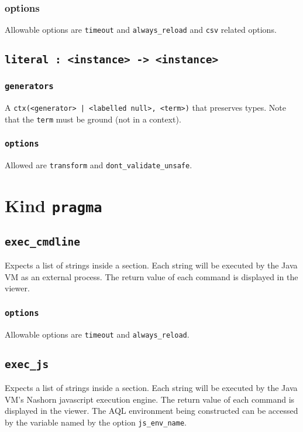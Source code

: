 \documentclass[10pt]{book}
\begin{document}
\subsection{options}
Allowable options are {\tt timeout} and {\tt always\_reload}  and {\tt csv} related options. 

\section{{\tt literal : <instance> -> <instance>}}

\subsection{{\tt generators}}
A {\tt ctx(<generator> | <labelled null>, <term>)} that preserves types.  Note that the {\tt term} must be ground (not in a context).  

\subsection{{\tt options}}
Allowed are {\tt transform} and {\tt dont\_validate\_unsafe}.

\chapter{Kind {\tt pragma}}
\section{{\tt exec\_cmdline}}
Expects a list of strings inside a section.  Each string will be executed by the Java VM as an external process.  The return value of each command is displayed in the viewer.

\subsection{{\tt options}}

Allowable options are {\tt timeout} and {\tt always\_reload}.

\section{{\tt exec\_js}} 
Expects a list of strings inside a section.  Each string will be executed by the Java VM's Nashorn javascript execution engine.  The return value of each command is displayed in the viewer.  The AQL environment being constructed can be accessed by the variable named by the option {\tt js\_env\_name}.
\end{document}
